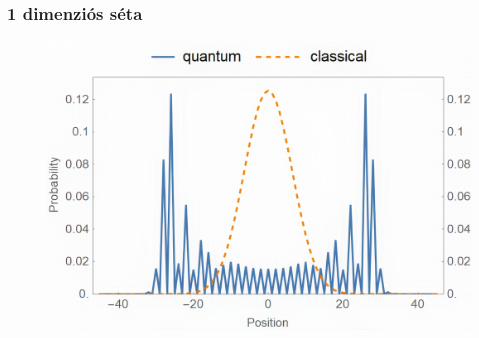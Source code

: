 \documentclass[aspectratio=169]{beamer}
\begin{document}
\begin{frame}
  \frametitle{1 dimenziós séta}
  \begin{figure}[H]
    \centering
    \includegraphics[width=0.6\linewidth]{./figures/teve.png}
  \end{figure}
\end{frame}
\end{document}
